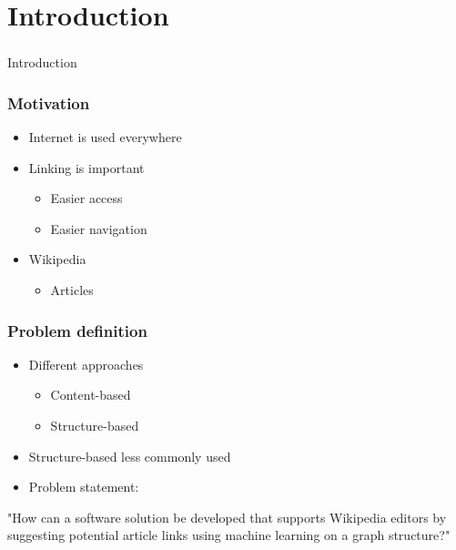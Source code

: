 \section[Introduction]{Introduction}

\begin{frame}
  \frametitle{}
  \begin{center}
    {\Huge Introduction}
  \end{center}
\end{frame}

\begin{frame}
    \frametitle{Motivation}
    \centering
    \begin{itemize}
      \item Internet is used everywhere
      \item Linking is important
        \begin{itemize}
          \item Easier access
          \item Easier navigation
        \end{itemize}
      \item Wikipedia
        \begin{itemize}
           \item Articles
         \end{itemize}
    \end{itemize}
\end{frame}

\begin{frame}
    \frametitle{Problem definition}
    \centering
    \begin{itemize}
      \item Different approaches
        \begin{itemize}
          \item Content-based
          \item Structure-based
        \end{itemize}
      \item Structure-based less commonly used
      \item Problem statement:
    \end{itemize}
    "How can a software solution be developed that supports Wikipedia editors by suggesting potential article links using machine learning on a graph structure?"
\end{frame}


